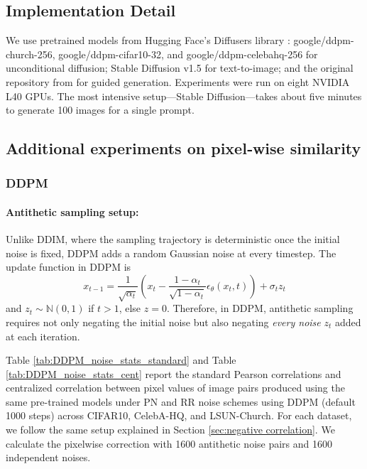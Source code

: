 \documentclass[12pt]{article}
\newcommand{\0}{\mathbf{0}}
\newcommand{\bN}{\mathbb{N}}
\begin{document}
\subsection{Implementation Detail}\label{subsec: implement detail}

We use pretrained models from Hugging Face’s Diffusers library \citep{von-platen-etal-2022-diffusers}: google/ddpm-church-256, google/ddpm-cifar10-32, and google/ddpm-celebahq-256 for unconditional diffusion; Stable Diffusion v1.5 for text-to-image; and the original repository from \citep{chung2023diffusion} for guided generation. Experiments were run on eight NVIDIA L40 GPUs. The most intensive setup—Stable Diffusion—takes about five minutes to generate 100 images for a single prompt.

\subsection{Additional experiments on pixel‐wise similarity}\label{subsec: additional experiment similarity}


\subsubsection{DDPM}

\paragraph{Antithetic sampling setup:} Unlike DDIM, where the sampling trajectory is deterministic once the initial noise is fixed, DDPM adds a random Gaussian noise at every timestep. The update function in DDPM is $$ x_{t-1} = \frac{1}{\sqrt{\alpha_t}}(x_t - \frac{1-\alpha_t}{\sqrt{1-\alpha_t}}\epsilon_\theta(x_t, t)) + \sigma_t z_t$$ and $z_t \sim \bN(0,1)$ if $t > 1$, else $z = 0$. Therefore, in DDPM, antithetic sampling requires not only negating the initial noise but also negating \textit{every noise} $z_t$ added at each iteration. 

Table \ref{tab:DDPM_noise_stats_standard} and Table \ref{tab:DDPM_noise_stats_cent} report the standard Pearson correlations and centralized correlation between pixel values of image pairs produced using the same pre-trained models under PN and RR noise schemes using DDPM (default 1000 steps) across CIFAR10, CelebA-HQ, and LSUN-Church. For each dataset, we follow the same setup explained in Section \ref{sec:negative correlation}. We calculate the pixelwise correction with 1600 antithetic noise pairs and 1600 independent noises. 
\end{document}
